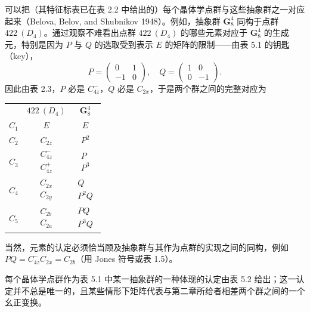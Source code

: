 可以把（其特征标表已在表 2.2 中给出的）每个晶体学点群与这些抽象群之一对应起来（Belova, Belov, and Shubnikov 1948）。例如，抽象群 $\mathbf{G}^{4}_{8}$ 同构于点群 $422\ (D_{4})$。通过观察不难看出点群 $422\ (D_{4})$ 的哪些元素对应于 $\mathbf{G}^{4}_{8}$ 的生成元，特别是因为 $P$ 与 $Q$ 的选取受到表示 $E$ 的矩阵的限制——由表 5.1 的钥匙（key），
\begin{equation*}
P = \begin{pmatrix} 0 & 1\\ -1 & 0 \end{pmatrix}, \quad Q = \begin{pmatrix} 1 & 0\\ 0 & -1 \end{pmatrix}.
\end{equation*}
因此由表 2.3，$P$ 必是 $C^{-}_{4z}$，$Q$ 必是 $C_{2x}$，于是两个群之间的完整对应为
\begin{center}
\begin{tabular}{lcc}
 & $422\ (D_{4})$ & $\mathbf{G}^{4}_{8}$\\
$C_{1}$ & $E$ & $E$\\
$C_{2}$ & $C_{2z}$ & $P^{2}$\\
$C_{3}$ & $\begin{array}{c}C^{-}_{4z}\\ C^{+}_{4z}\end{array}$ & $\begin{array}{c}P\\ P^{3}\end{array}$\\
$C_{4}$ & $\begin{array}{c}C_{2x}\\ C_{2y}\end{array}$ & $\begin{array}{c}Q\\ P^{2}Q\end{array}$\\
$C_{5}$ & $\begin{array}{c}C_{2b}\\ C_{2a}\end{array}$ & $\begin{array}{c}PQ\\ P^{3}Q\end{array}$
\end{tabular}
\end{center}
当然，元素的认定必须恰当顾及抽象群与其作为点群的实现之间的同构，例如 $PQ = C^{-}_{4z}C_{2x} = C_{2b}$（用 Jones 符号或表 1.5）。

每个晶体学点群作为表 5.1 中某一抽象群的一种体现的认定由表 5.2 给出；这一认定并不总是唯一的，且某些情形下矩阵代表与第二章所给者相差两个群之间的一个幺正变换。
